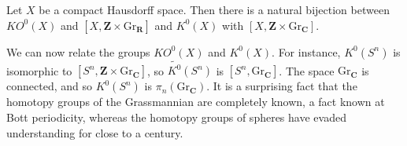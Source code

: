 \begin{corollary}
    Let $X$ be a compact Hausdorff space. Then there is a natural bijection between $KO^0(X)$ and $[X,\mathbf{Z} \times \text{Gr}_{\mathbf{R}}]$ and $K^0(X)$ with $[X,\mathbf{Z} \times \text{Gr}_{\mathbf{C}}]$.
\end{corollary}

We can now relate the groups $KO^0(X)$ and $K^0(X)$. For instance, $K^0(S^n)$ is isomorphic to $[S^n, \mathbf{Z} \times \text{Gr}_{\mathbf{C}}]$, so $\widetilde{K^0}(S^n)$ is $[S^n, \text{Gr}_{\mathbf{C}}]$. The space $\text{Gr}_{\mathbf{C}}$ is connected, and so $K^0(S^n)$ is $\pi_n(\text{Gr}_{\mathbf{C}})$. It is a surprising fact that the homotopy groups of the Grassmannian are completely known, a fact known at Bott periodicity, whereas the homotopy groups of spheres have evaded understanding for close to a century.